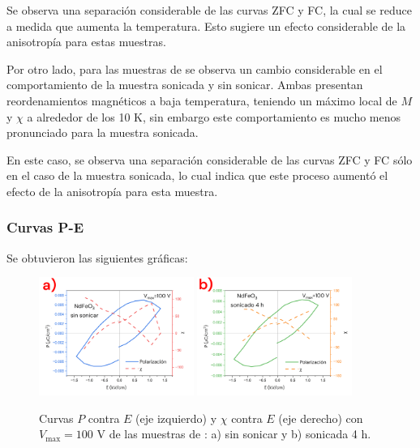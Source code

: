 \documentclass[../main.tex]{subfiles}
\begin{document}
Se observa una separación considerable de las curvas ZFC y FC, la cual se reduce a medida que aumenta la temperatura. Esto sugiere un efecto considerable de la anisotropía para estas muestras.

Por otro lado, para las muestras de \sama{} se observa un cambio considerable en el comportamiento de la muestra sonicada y sin sonicar. Ambas presentan reordenamientos magnéticos a baja temperatura, teniendo un máximo local de $M$ y $\chi$ a alrededor de los 10 K, sin embargo este comportamiento es mucho menos pronunciado para la muestra sonicada.

En este caso, se observa una separación considerable de las curvas ZFC y FC sólo en el caso de la muestra sonicada, lo cual indica que este proceso aumentó el efecto de la anisotropía para esta muestra.
\subsubsection{Curvas P-E}
Se obtuvieron las siguientes gráficas:
\begin{figure}[H]
    \centering
    \includegraphics[width=0.45\textwidth]{fig/PENdFeO3100V.png}
    \quad
    \includegraphics[width=0.45\textwidth]{fig/PENdFeO3-S100V.png}
    \caption{Curvas $P$ contra $E$ (eje izquierdo) y $\chi$ contra $E$ (eje derecho) con $V_\text{max}=100$ V de las muestras de \neod{}: a) sin sonicar y b) sonicada 4 h.}
    \label{fig:nd100v}
\end{figure}
\end{document}
